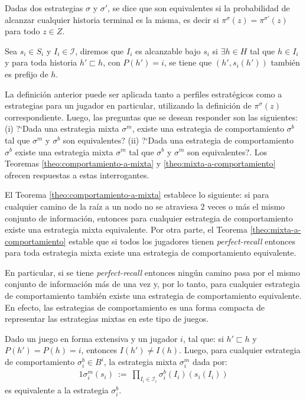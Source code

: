 \begin{definition}
\label{def:equivalencia-estrategias}
Dadas dos estrategias $\sigma$ y $\sigma'$, se dice que son equivalentes si la probabilidad de alcanzar cualquier historia terminal es la misma, es decir si $\pi^\sigma(z) = \pi^{\sigma'}(z)$ para todo $z \in Z$.
\end{definition}

\begin{definition}
\label{def:alcanzabilidad-historia}
Sea $s_i \in S_i$ y $I_i \in \mathcal{I}$, diremos que $I_i$ es alcanzable bajo $s_i$ si $\exists h \in H$ tal que $h \in I_i$ y para toda historia $h' \sqsubset h$, con $P(h') = i$, se tiene que $(h', s_i(h'))$ también es prefijo de $h$.  
\end{definition}

La definición anterior puede ser aplicada tanto a perfiles estratégicos como a estrategias para un jugador en particular, utilizando la definición de $\pi^{\sigma}(z)$ correspondiente. Luego, las preguntas que se desean responder son las siguientes: (i) ?`Dada una estrategia mixta $\sigma^m$, existe una estrategia de comportamiento $\sigma^b$ tal que $\sigma^m$ y $\sigma^b$ son equivalentes? (ii) ?`Dada una estrategia de comportamiento $\sigma^b$ existe una estrategia mixta $\sigma^m$ tal que $\sigma^b$ y $\sigma^m$ son equivalentes?. Los Teoremas \ref{theo:comportamiento-a-mixta} y \ref{theo:mixta-a-comportamiento} ofrecen respuestas a estas interrogantes.

El Teorema \ref{theo:comportamiento-a-mixta} establece lo siguiente: si para cualquier camino de la raíz a un nodo no se atraviesa $2$ veces o más el mismo conjunto de información, entonces para cualquier estrategia de comportamiento existe una estrategia mixta equivalente. Por otra parte, el Teorema \ref{theo:mixta-a-comportamiento} estable que si todos los jugadores tienen \textit{perfect-recall} entonces para toda estrategia mixta existe una estrategia de comportamiento equivalente.

En particular, si se tiene \textit{perfect-recall} entonces ningún camino pasa por el mismo conjunto de información más de una vez y, por lo tanto, para cualquier estrategia de comportamiento también existe una estrategia de comportamiento equivalente. En efecto, las estrategias de comportamiento es una forma compacta de representar las estrategias mixtas en este tipo de juegos.

\begin{theorem}
\label{theo:comportamiento-a-mixta}
Dado un juego en forma extensiva y un jugador $i$, tal que: si $h' \sqsubset h$ y $P(h') = P(h) = i$, entonces $I(h') \neq I(h)$. Luego, para cualquier estrategia de comportamiento $\sigma^b_i \in B^i$, la estrategia mixta $\sigma^m_i$ dada por:
\begin{alignat}{1}
\sigma^m_i(s_i)\ :=\ \prod_{I_i \in \mathcal{I}_i} \sigma^b_i(I_i)(s_i(I_i)) \label{eq:comportamiento-a-mixta}
\end{alignat}
es equivalente a la estrategia $\sigma^b_i$.
\end{theorem}

